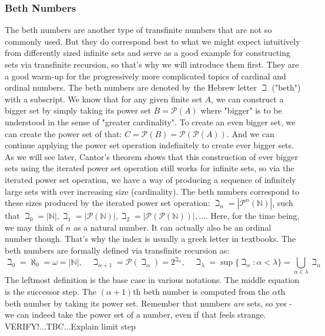 \subsubsection{Beth Numbers}
The beth numbers are another type of transfinite numbers that are not so commonly used. But they do correspond best to what we might expect intuitively from differently sized infinite sets and serve as a good example for constructing sets via transfinite recursion, so that's why we will introduce them first. They are a good warm-up for the progressively more complicated topics of cardinal and ordinal numbers. The beth numbers are denoted by the Hebrew letter $\beth$ ("beth") with a subscript. We know that for any given finite set $A$, we can construct a bigger set by simply taking its power set $B = \mathcal{P}(A)$ where "bigger" is to be understood in the sense of "greater cardinality". To create an even bigger set, we can create the power set of that: $C = \mathcal{P}(B) = \mathcal{P}(\mathcal{P}(A))$. And we can continue applying the power set operation indefinitely to create ever bigger sets. As we will see later, Cantor's theorem shows that this construction of ever bigger sets using the iterated power set operation still works for infinite sets, so via the iterated power set operation, we have a way of producing a sequence of infinitely large sets with ever increasing size (cardinality). The beth numbers correspond to these sizes produced by the iterated power set operation: $\beth_n = |\mathcal{P}^n (\mathbb{N})|$, such that $\beth_0 = |\mathbb{N}|, \beth_1 = |\mathcal{P} (\mathbb{N})|, \beth_2 = |\mathcal{P}(\mathcal{P} (\mathbb{N}))|, \ldots$. Here, for the time being, we may think of $n$ as a natural number. It can actually also be an ordinal number though. That's why the index is usually a greek letter in textbooks. The beth numbers are formally defined via transfinite recursion as:
\begin{equation}
\beth_0 = \aleph_0 
        = \omega 
        = |\mathbb{N}|, \quad
\beth_{\alpha + 1} = \mathcal{P}(\beth_{\alpha}) 
                   = 2^{\beth_{\alpha}}, \quad
\beth_{\lambda} = \sup \{ \beth_{\alpha} : \alpha < \lambda \} 
                = \bigcup_{\alpha \in \lambda} \beth_{\alpha} 
\end{equation}
The leftmost definition is the base case in various notations. The middle equation is the successor step. The $(\alpha+1)$th beth number is computed from the $\alpha$th beth number by taking its power set. Remember that numbers \emph{are} sets, so yes - we can indeed take the power set of a number, even if that feels strange. VERIFY!...TBC...Explain limit step


